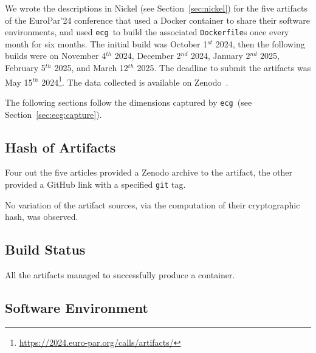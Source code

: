 \documentclass[sigconf,natbib=false]{acmart}
\newcommand{\df}{\texttt{Dockerfile}}
\newcommand{\ecg}{\texttt{ecg}}
\newcommand{\todo}[1]{{\color{red}{TODO: #1}}}
\begin{document}


We wrote the descriptions in Nickel (see Section~\ref{sec:nickel}) for the five artifacts of the EuroPar'24 conference that used a Docker container to share their software environments, and used \ecg\ to build the associated \df s once every month for six months.
The initial build was October 1$^{st}$ 2024, then the following builds were on November 4$^{th}$ 2024, December 2$^{nd}$ 2024, January 2$^{nd}$ 2025, February 5$^{th}$ 2025, and March 12$^{th}$ 2025.
The deadline to submit the artifacts was May 15$^{th}$ 2024\footnote{\url{https://2024.euro-par.org/calls/artifacts/}}.
The data collected is available on Zenodo~\cite{dataset_europar24}.

The following sections follow the dimensions captured by \ecg\ (see Section~\ref{sec:ecg:capture}).

\subsection{Hash of Artifacts}

Four out the five articles provided a Zenodo archive to the artifact, the other provided a GitHub link with a specified \texttt{git} tag.

No variation of the artifact sources, via the computation of their cryptographic hash, was observed.

\subsection{Build Status}

All the artifacts managed to successfully produce a container.

\subsection{Software Environment}
\end{document}
